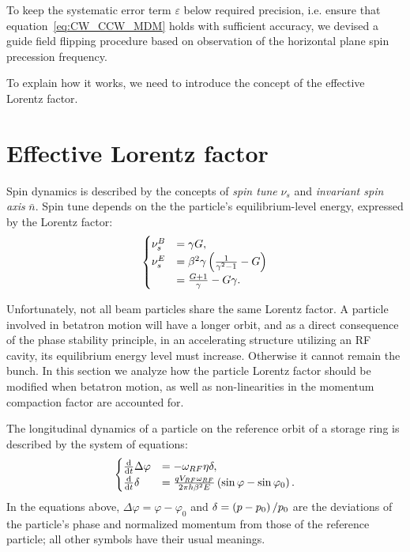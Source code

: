 \documentclass[a4paper]{jacow}
\newcommand{\w}{\omega}
\newcommand{\nbar}{\bar n}
\newcommand{\D}{\Delta}
\begin{document}
To keep the systematic error term $\varepsilon$ below required precision, i.e. ensure
that equation~\eqref{eq:CW_CCW_MDM} holds with sufficient accuracy, we devised a guide field flipping procedure
based on observation of the horizontal plane spin precession frequency.

To explain how it works, we need to introduce the concept of the effective Lorentz factor.

\section{Effective Lorentz factor}
Spin dynamics is described by the concepts of \emph{spin tune} $\nu_s$ and \emph{invariant spin axis} $\nbar$.
Spin tune depends on the the particle's  equilibrium-level energy, expressed by the Lorentz factor:
\begin{equation}\label{eq:spin_tune_vs_gamma}
  \begin{cases}
    \nu_s^B &= \gamma G, \\
    \nu_s^E &= \beta^2\gamma\bkt{\frac{1}{\gamma^2-1} - G} \\
            &= \frac{G+1}{\gamma} - G\gamma.
  \end{cases}
\end{equation}

Unfortunately, not all beam particles share the same Lorentz factor. A particle involved in betatron
motion will have a longer orbit, and as a direct consequence of the phase stability principle,
in an accelerating structure utilizing an RF cavity, its equilibrium energy level 
must increase. Otherwise it cannot remain the bunch. In this section we analyze how the particle Lorentz factor
should be modified when betatron motion, as well as non-linearities in the momentum compaction factor are
accounted for.

The longitudinal dynamics of a particle on the reference orbit of a storage ring is described
by the system of equations:
\begin{equation}
  \begin{cases}
    \ddt{}\D\varphi &= -\w_{RF}\eta\delta, \\
    \ddt{}\delta &= \frac{q V_{RF}\w_{RF}}{2\pi h\beta^2E}\bkt{\sin\varphi - \sin\varphi_0}.
  \end{cases}
\end{equation}
In the equations above, $\D\varphi = \varphi - \varphi_0$ and
$\delta = \bkt{p-p_0}/{p_0}$ are the deviations of the particle's phase and
normalized momentum from those of the reference particle; all other symbols have their usual meanings.
\end{document}
